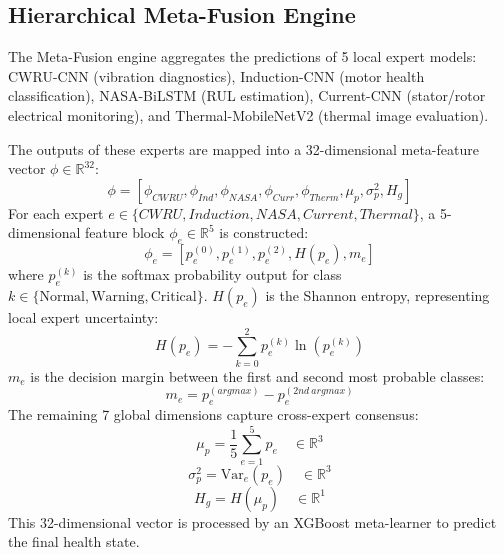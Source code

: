 \documentclass[journal]{IEEEtran}
\begin{document}
\subsection{Hierarchical Meta-Fusion Engine}
The Meta-Fusion engine aggregates the predictions of 5 local expert models: CWRU-CNN (vibration diagnostics), Induction-CNN (motor health classification), NASA-BiLSTM (RUL estimation), Current-CNN (stator/rotor electrical monitoring), and Thermal-MobileNetV2 (thermal image evaluation).

The outputs of these experts are mapped into a 32-dimensional meta-feature vector $\phi \in \mathbb{R}^{32}$:
\begin{equation}
\phi = [\phi_{CWRU}, \phi_{Ind}, \phi_{NASA}, \phi_{Curr}, \phi_{Therm}, \mu_p, \sigma^2_p, H_g]
\end{equation}
For each expert $e \in \{CWRU, Induction, NASA, Current, Thermal\}$, a 5-dimensional feature block $\phi_e \in \mathbb{R}^5$ is constructed:
\begin{equation}
\phi_e = [p_e^{(0)}, p_e^{(1)}, p_e^{(2)}, H(p_e), m_e]
\end{equation}
where $p_e^{(k)}$ is the softmax probability output for class $k \in \{\text{Normal}, \text{Warning}, \text{Critical}\}$.
$H(p_e)$ is the Shannon entropy, representing local expert uncertainty:
\begin{equation}
H(p_e) = -\sum_{k=0}^{2} p_e^{(k)} \ln(p_e^{(k)})
\end{equation}
$m_e$ is the decision margin between the first and second most probable classes:
\begin{equation}
m_e = p_e^{(argmax)} - p_e^{(2nd\ argmax)}
\end{equation}
The remaining 7 global dimensions capture cross-expert consensus:
\begin{equation}
\mu_p = \frac{1}{5} \sum_{e=1}^{5} p_e \quad \in \mathbb{R}^3
\end{equation}
\begin{equation}
\sigma^2_p = \text{Var}_e(p_e) \quad \in \mathbb{R}^3
\end{equation}
\begin{equation}
H_g = H(\mu_p) \quad \in \mathbb{R}^1
\end{equation}
This 32-dimensional vector is processed by an XGBoost meta-learner to predict the final health state.
\end{document}
